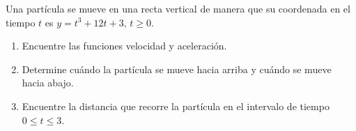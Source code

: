 \item Una partícula se mueve en una recta vertical de manera que su coordenada en el tiempo $t$ es $y = t^3 + 12t + 3, \, t \ge 0$.
\begin{enumerate}
    \item[(a)] Encuentre las funciones velocidad y aceleración.
    \item[(b)] Determine cuándo la partícula se mueve hacia arriba y cuándo se mueve hacia abajo.
    \item[(c)] Encuentre la distancia que recorre la partícula en el intervalo de tiempo $0 \le t \le 3$.
\end{enumerate}
